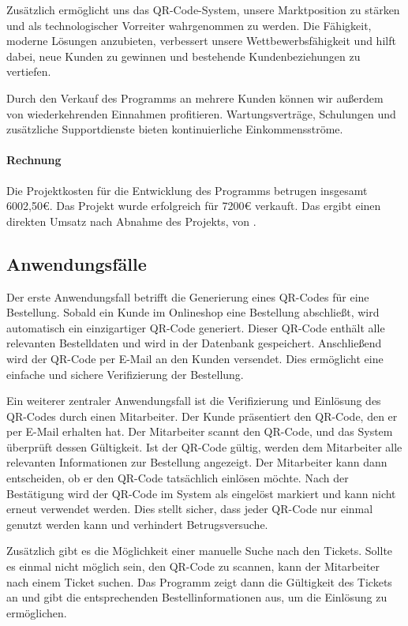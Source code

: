Zusätzlich ermöglicht uns das QR-Code-System, unsere Marktposition zu stärken und als technologischer Vorreiter wahrgenommen zu werden. Die Fähigkeit, moderne Lösungen anzubieten, verbessert unsere Wettbewerbsfähigkeit und hilft dabei, neue Kunden zu gewinnen und bestehende Kundenbeziehungen zu vertiefen.

Durch den Verkauf des Programms an mehrere Kunden können wir außerdem von wiederkehrenden Einnahmen profitieren. Wartungsverträge, Schulungen und zusätzliche Supportdienste bieten kontinuierliche Einkommensströme.

\paragraph{Rechnung}
Die Projektkosten für die Entwicklung des Programms betrugen insgesamt 6002,50€. Das Projekt wurde erfolgreich für 7200€ verkauft. Das ergibt einen direkten Umsatz nach Abnahme des Projekts, von .

\subsection{Anwendungsfälle}
\label{sec:Anwendungsfaelle}

Der erste Anwendungsfall betrifft die Generierung eines QR-Codes für eine Bestellung. Sobald ein Kunde im Onlineshop eine Bestellung abschließt, wird automatisch ein einzigartiger QR-Code generiert. Dieser QR-Code enthält alle relevanten Bestelldaten und wird in der Datenbank gespeichert. Anschließend wird der QR-Code per E-Mail an den Kunden versendet. Dies ermöglicht eine einfache und sichere Verifizierung der Bestellung.

Ein weiterer zentraler Anwendungsfall ist die Verifizierung und Einlösung des QR-Codes durch einen Mitarbeiter. Der Kunde präsentiert den QR-Code, den er per E-Mail erhalten hat. Der Mitarbeiter scannt den QR-Code, und das System überprüft dessen Gültigkeit. Ist der QR-Code gültig, werden dem Mitarbeiter alle relevanten Informationen zur Bestellung angezeigt. Der Mitarbeiter kann dann entscheiden, ob er den QR-Code tatsächlich einlösen möchte. Nach der Bestätigung wird der QR-Code im System als eingelöst markiert und kann nicht erneut verwendet werden. Dies stellt sicher, dass jeder QR-Code nur einmal genutzt werden kann und verhindert Betrugsversuche.

Zusätzlich gibt es die Möglichkeit einer manuelle Suche nach den Tickets. Sollte es einmal nicht möglich sein, den QR-Code zu scannen, kann der Mitarbeiter nach einem Ticket suchen. Das Programm zeigt dann die Gültigkeit des Tickets an und gibt die entsprechenden Bestellinformationen aus, um die Einlösung zu ermöglichen.

